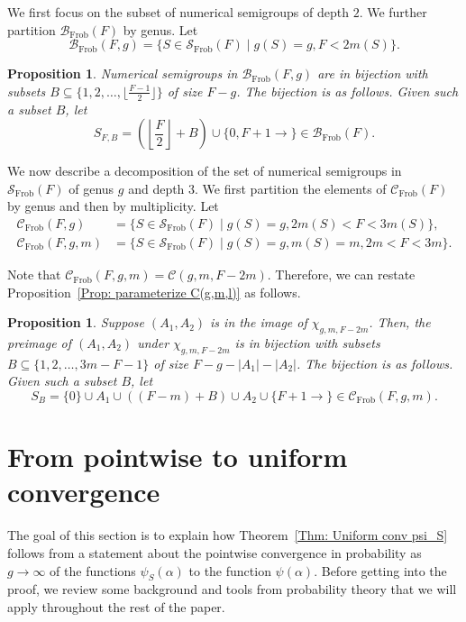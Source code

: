 \documentclass[12pt]{amsart}
\def\B{{\mathcal B}}
\newcommand{\cC}{\mathcal{C}}
\def\SS{{\mathcal S}}
\newcommand{\Frob}{\text{Frob}}
\newtheorem{proposition}[theorem]{Proposition}
\begin{document}
We first focus on the subset of numerical semigroups of depth $2$. We further partition $\B_{\Frob}(F)$ by genus. Let
\[
\B_{\Frob}(F,g)=\{S\in\SS_{\Frob}(F)\mid g(S)=g, F<2m(S)\}.
\]


\begin{proposition}\cite[Theorem 10]{singhal2022distribution}\label{Prop: depth 2 by frob}
Numerical semigroups in $\B_{\Frob}(F,g)$ are in bijection with subsets $B\subseteq \{1,2,\dots,\lfloor\frac{F-1}{2} \rfloor\}$ of size $F-g$. The bijection is as follows. Given such a subset $B$, let
\[
S_{F,B}=
\left( \left\lfloor \frac{F}{2} \right\rfloor+B\right) \cup\{0,F+1\rightarrow\} \in \B_{\Frob}(F).
\]
\end{proposition}

We now describe a decomposition of the set of numerical semigroups in $\SS_{\Frob}(F)$ of genus $g$ and depth $3$.
We first partition the elements of $\cC_{\Frob}(F)$ by genus and then by multiplicity. Let
\begin{align*}
\cC_{\Frob}(F,g)& =\{S\in\SS_{\Frob}(F)\mid g(S)=g,2m(S)<F<3m(S)\},\\
\cC_{\Frob}(F,g,m) & =\{S\in\SS_{\Frob}(F)\mid g(S)=g,m(S)=m,2m<F<3m\}.
\end{align*}

Note that $\cC_{\Frob}(F,g,m)=\cC(g,m,F-2m)$. Therefore, we can restate Proposition~\ref{Prop: parameterize C(g,m,l)} as follows.
\begin{proposition}\label{Prop: parameterize C(F,m,g) by frob}
Suppose $(A_1,A_2)$ is in the image of $\chi_{g,m,F-2m}$. Then, the preimage of $(A_1,A_2)$ under $\chi_{g,m,F-2m}$ is in bijection with subsets $B\subseteq \{1,2,\dots,3m-F-1\}$ of size $F-g-|A_1|-|A_2|$. The bijection is as follows.  Given such a subset $B$, let
\[S_B=\{0\}\cup A_1 \cup ((F-m)+ B)\cup A_2\cup\{F+1\rightarrow\} \in \cC_{\Frob}(F,g,m).\]
\end{proposition}













\section{From pointwise to uniform convergence}\label{sec:uniform_pointwise}

The goal of this section is to explain how Theorem~\ref{Thm: Uniform conv psi_S} follows from a statement about the pointwise convergence in probability as $g \rightarrow \infty$ of the functions $\psi_S(\alpha)$ to the function $\psi(\alpha)$.  Before getting into the proof, we review some background and tools from probability theory that we will apply throughout the rest of the paper.
\end{document}

